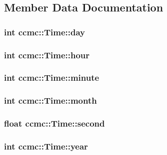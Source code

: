 \subsection{Member Data Documentation}
\hypertarget{classccmc_1_1_time_aadc5355945380825c132e4c1cddcb24f}{
\subsubsection[{day}]{\setlength{\rightskip}{0pt plus 5cm}int ccmc\-::\-Time\-::day}}\label{classccmc_1_1_time_aadc5355945380825c132e4c1cddcb24f}
\hypertarget{classccmc_1_1_time_aacdc28bb90a2c42e0b266a596220ef40}{
\subsubsection[{hour}]{\setlength{\rightskip}{0pt plus 5cm}int ccmc\-::\-Time\-::hour}}\label{classccmc_1_1_time_aacdc28bb90a2c42e0b266a596220ef40}
\hypertarget{classccmc_1_1_time_a163cc0bbdcf86f8a009a26d3c2764f17}{
\subsubsection[{minute}]{\setlength{\rightskip}{0pt plus 5cm}int ccmc\-::\-Time\-::minute}}\label{classccmc_1_1_time_a163cc0bbdcf86f8a009a26d3c2764f17}
\hypertarget{classccmc_1_1_time_a837bd8b4d92b602f60f99741270515d2}{
\subsubsection[{month}]{\setlength{\rightskip}{0pt plus 5cm}int ccmc\-::\-Time\-::month}}\label{classccmc_1_1_time_a837bd8b4d92b602f60f99741270515d2}
\hypertarget{classccmc_1_1_time_a569557baed8e5bf1e30cea22aa4a76c9}{
\subsubsection[{second}]{\setlength{\rightskip}{0pt plus 5cm}float ccmc\-::\-Time\-::second}}\label{classccmc_1_1_time_a569557baed8e5bf1e30cea22aa4a76c9}
\hypertarget{classccmc_1_1_time_a5f1d2d7bf202a400b3a101645f93c1a0}{
\subsubsection[{year}]{\setlength{\rightskip}{0pt plus 5cm}int ccmc\-::\-Time\-::year}}\label{classccmc_1_1_time_a5f1d2d7bf202a400b3a101645f93c1a0}



